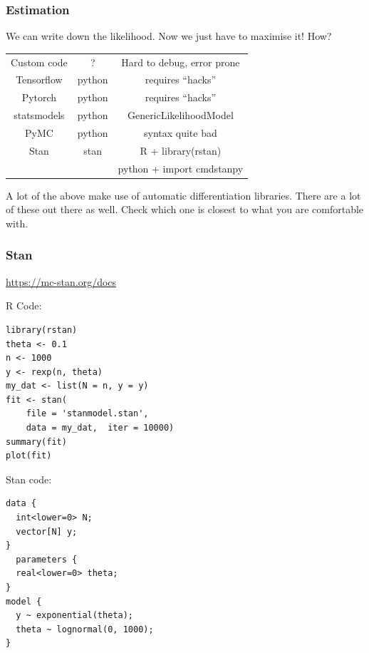\documentclass[usenames,dvipsnames]{beamer}
\begin{document}
\begin{frame}
\frametitle{Estimation}

We can write down the likelihood. Now we just have to maximise it! How?

\begin{center}
\begin{tabular}{ccc}
\hline
Custom code &  ?   &Hard to debug, error prone \\
Tensorflow  &  python   &  requires ``hacks''  \\
Pytorch     &  python   &  requires ``hacks'' \\
statsmodels &  python   & GenericLikelihoodModel \\
PyMC        &  python   & syntax quite bad   \\
Stan        &  stan     & R + library(rstan)  \\
            &           & python + import cmdstanpy \\
\hline
\end{tabular}
\end{center}


A lot of the above make use of automatic differentiation libraries.
There are a lot of these out there as well.
Check which one is closest to what you are comfortable with.

\end{frame}

\begin{frame}[fragile]
\frametitle{Stan}

\centering
\href{https://mc-stan.org/docs}{https://mc-stan.org/docs}

\vfill
\tiny

R Code:
\begin{verbatim}
library(rstan)
theta <- 0.1
n <- 1000
y <- rexp(n, theta)
my_dat <- list(N = n, y = y)
fit <- stan(
    file = 'stanmodel.stan', 
    data = my_dat,  iter = 10000)
summary(fit)
plot(fit)
\end{verbatim}

Stan code:
\begin{verbatim}
data {
  int<lower=0> N;
  vector[N] y;
}
  parameters {
  real<lower=0> theta;
}
model {
  y ~ exponential(theta);
  theta ~ lognormal(0, 1000);
}
\end{verbatim}

\end{frame}
\end{document}
